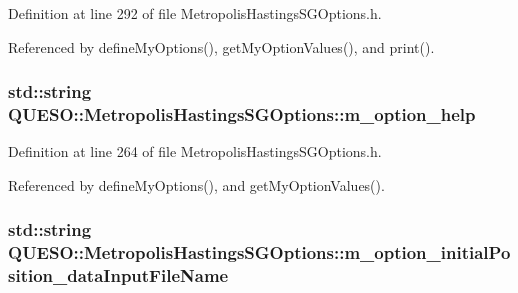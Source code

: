 Definition at line 292 of file Metropolis\-Hastings\-S\-G\-Options.\-h.



Referenced by define\-My\-Options(), get\-My\-Option\-Values(), and print().

\hypertarget{class_q_u_e_s_o_1_1_metropolis_hastings_s_g_options_af73e79036b108974843e26bc036c70ce}{
\subsubsection[{m\-\_\-option\-\_\-help}]{\setlength{\rightskip}{0pt plus 5cm}std\-::string Q\-U\-E\-S\-O\-::\-Metropolis\-Hastings\-S\-G\-Options\-::m\-\_\-option\-\_\-help\hspace{0.3cm}{\ttfamily [private]}}}\label{class_q_u_e_s_o_1_1_metropolis_hastings_s_g_options_af73e79036b108974843e26bc036c70ce}


Definition at line 264 of file Metropolis\-Hastings\-S\-G\-Options.\-h.



Referenced by define\-My\-Options(), and get\-My\-Option\-Values().

\hypertarget{class_q_u_e_s_o_1_1_metropolis_hastings_s_g_options_a2dbb00eec372f529d21f770b0f220bd9}{
\subsubsection[{m\-\_\-option\-\_\-initial\-Position\-\_\-data\-Input\-File\-Name}]{\setlength{\rightskip}{0pt plus 5cm}std\-::string Q\-U\-E\-S\-O\-::\-Metropolis\-Hastings\-S\-G\-Options\-::m\-\_\-option\-\_\-initial\-Position\-\_\-data\-Input\-File\-Name\hspace{0.3cm}{\ttfamily [private]}}}\label{class_q_u_e_s_o_1_1_metropolis_hastings_s_g_options_a2dbb00eec372f529d21f770b0f220bd9}


